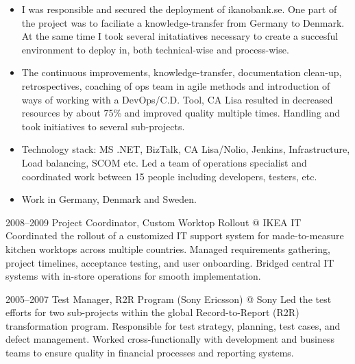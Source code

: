 \begin{itemize}
    \item I was responsible and secured the deployment of ikanobank.se. One part of the project was to faciliate a knowledge-transfer from Germany to Denmark. At the same time I took several initatiatives necessary to create a succesful environment to deploy in, both technical-wise and process-wise. 
    
    \item The continuous improvements, knowledge-transfer, documentation clean-up, retrospectives, coaching of ops team in agile methods and introduction of ways of working with a DevOps/C.D. Tool, CA Lisa resulted in decreased resources by about 75\% and improved quality multiple times. Handling and took initiatives to several sub-projects. 
    
    \item Technology stack: MS .NET, BizTalk, CA Lisa/Nolio, Jenkins, Infrastructure, Load balancing, SCOM etc. Led a team of operations specialist and coordinated work between 15 people including developers, testers, etc. 
    
    \item Work in Germany, Denmark and Sweden. 
\end{itemize}

\cventry
  {2008–2009}
  {Project Coordinator, Custom Worktop Rollout}
  {@ IKEA IT}
  {}
  {}
  {Coordinated the rollout of a customized IT support system for made-to-measure kitchen worktops across multiple countries. Managed requirements gathering, project timelines, acceptance testing, and user onboarding. Bridged central IT systems with in-store operations for smooth implementation.}

\cventry
  {2005–2007}
  {Test Manager, R2R Program (Sony Ericsson)}
  {@ Sony}
  {}
  {}
  {Led the test efforts for two sub-projects within the global Record-to-Report (R2R) transformation program. Responsible for test strategy, planning, test cases, and defect management. Worked cross-functionally with development and business teams to ensure quality in financial processes and reporting systems.}

